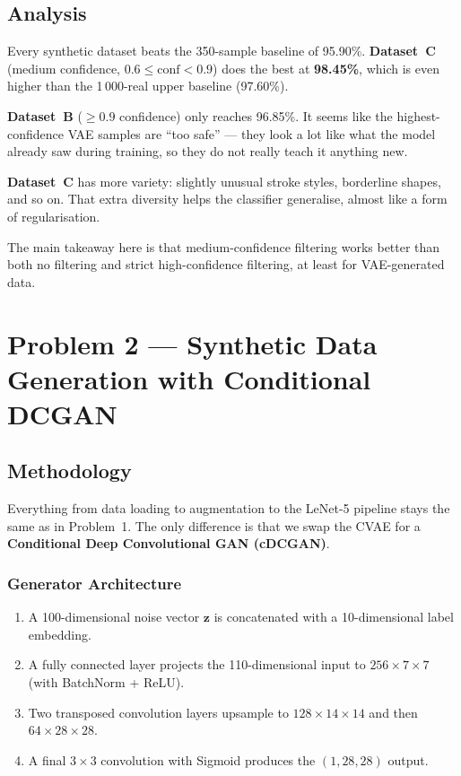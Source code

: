 \documentclass[12pt, a4paper]{article}
\begin{document}
\subsection{Analysis}

Every synthetic dataset beats the 350-sample baseline of 95.90\%.
\textbf{Dataset~C} (medium confidence, $0.6 \leq \text{conf} < 0.9$) does the best at
\textbf{98.45\%}, which is even higher than the 1\,000-real upper baseline (97.60\%).

\textbf{Dataset~B} ($\geq 0.9$ confidence) only reaches 96.85\%.  It seems like the
highest-confidence VAE samples are ``too safe'' --- they look a lot like what the model
already saw during training, so they do not really teach it anything new.

\textbf{Dataset~C} has more variety: slightly unusual stroke styles, borderline shapes, and
so on.  That extra diversity helps the classifier generalise, almost like a form of
regularisation.

The main takeaway here is that medium-confidence filtering works better than both no
filtering and strict high-confidence filtering, at least for VAE-generated data.

\section{Problem 2 --- Synthetic Data Generation with Conditional DCGAN}

\subsection{Methodology}

Everything from data loading to augmentation to the LeNet-5 pipeline stays the same as
in Problem~1.  The only difference is that we swap the CVAE for a
\textbf{Conditional Deep Convolutional GAN (cDCGAN)}.

\subsubsection{Generator Architecture}

\begin{enumerate}
    \item A 100-dimensional noise vector $\mathbf{z}$ is concatenated with a 10-dimensional
          label embedding.
    \item A fully connected layer projects the 110-dimensional input to $256 \times 7 \times 7$
          (with BatchNorm + ReLU).
    \item Two transposed convolution layers upsample to $128 \times 14 \times 14$ and then
          $64 \times 28 \times 28$.
    \item A final $3 \times 3$ convolution with Sigmoid produces the $(1, 28, 28)$ output.
\end{enumerate}
\end{document}
